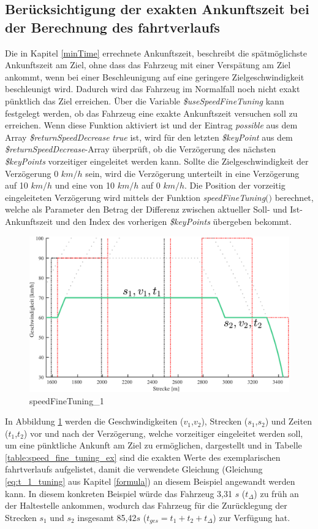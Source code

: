\subsection{Berücksichtigung der exakten Ankunftszeit bei der Berechnung des \Gls{fahrtverlauf}s} \label{time2}
Die in Kapitel \ref{minTime} errechnete Ankunftszeit, beschreibt die spätmöglichste Ankunftszeit am Ziel, ohne dass das Fahrzeug mit einer Verspätung am Ziel ankommt, wenn bei einer Beschleunigung auf eine geringere Zielgeschwindigkeit beschleunigt wird. Dadurch wird das Fahrzeug im Normalfall noch nicht exakt pünktlich das Ziel erreichen. Über die Variable \textit{\$useSpeedFineTuning} kann festgelegt werden, ob das Fahrzeug eine exakte Ankunftszeit versuchen soll zu erreichen. Wenn diese Funktion aktiviert ist und der Eintrag \textit{possible} aus dem Array \textit{\$returnSpeedDecrease} \textit{true} ist, wird für den letzten \textit{\$keyPoint} aus dem \textit{\$returnSpeedDecrease}-Array überprüft, ob die Verzögerung des nächsten \textit{\$keyPoints} vorzeitiger eingeleitet werden kann. Sollte die Zielgeschwindigkeit der Verzögerung 0 $km/h$ sein, wird die Verzögerung unterteilt in eine Verzögerung auf 10 $km/h$ und eine von 10 $km/h$ auf 0 $km/h$. Die Position der vorzeitig eingeleiteten Verzögerung wird mittels der Funktion \textit{speedFineTuning$($$)$} berechnet, welche als Parameter den Betrag der Differenz zwischen aktueller Soll- und Ist-Ankunftszeit und den Index des vorherigen \textit{\$keyPoints} übergeben bekommt.
\begin{figure}
\includegraphics[width=\linewidth]{../images/matlab/it11.pdf}
\caption{speedFineTuning\_1}
\label{fig:it11}
\end{figure}
In Abbildung \ref{fig:it11} werden die Geschwindigkeiten ($v_1$,$v_2$), Strecken ($s_1$,$s_2$) und Zeiten ($t_1$,$t_2$) vor und nach der Verzögerung, welche vorzeitiger eingeleitet werden soll, um eine pünktliche Ankunft am Ziel zu ermöglichen, dargestellt und in Tabelle \ref{table:speed_fine_tuning_ex} sind die exakten Werte des exemplarischen \Gls{fahrtverlauf}s aufgelistet, damit die verwendete Gleichung (Gleichung \ref{eq:t_1_tuning} aus Kapitel \ref{formula}) an diesem Beispiel angewandt werden kann. In diesem konkreten Beispiel würde das Fahrzeug 3,31 $s$ ($t_{\varDelta}$) zu früh an der Haltestelle ankommen, wodurch das Fahrzeug für die Zurücklegung der Strecken $s_1$ und $s_2$ insgesamt 85,42$s$ ($t_{ges}=t_1+t_2+t_{\varDelta}$) zur Verfügung hat.
